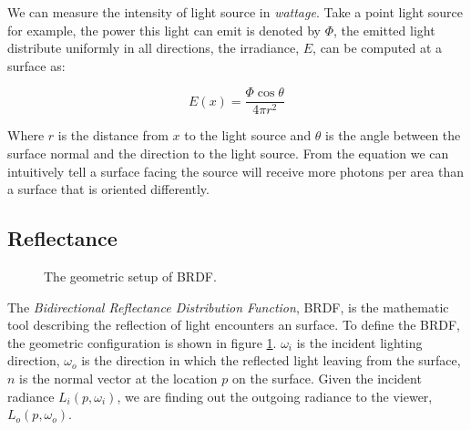 We can measure the intensity of light source in \emph{wattage}. Take a point light source for example, the power this light can emit is denoted by \(\Phi\), the emitted light distribute uniformly in all directions, the irradiance, \(E\), can be computed at a surface as: 

\begin{equation}
E(x) = \frac{\Phi \cos{\theta}}{4\pi r^{2}} 
\end{equation}

Where \(r\) is the distance from \(x\) to the light source and \(\theta\) is the angle between the surface normal and the direction to the light source. From the equation we can intuitively tell a surface facing the source will receive more photons per area than a surface that is oriented differently.   

\subsection{Reflectance} 
\begin{figure}[htp] 
    \centering 
    \renewcommand{\thefigure}{\thechapter.\arabic{figure}}
    \caption[]{The geometric setup of BRDF. }
    \label{fig:brdf} 
\end{figure} 

The \emph{Bidirectional Reflectance Distribution Function}, BRDF, is the mathematic tool describing the reflection of light encounters an surface. To define the BRDF, the geometric configuration is shown in figure \ref{fig:brdf}. \(\omega_{i}\) is the incident lighting direction, \(\omega_{o}\) is the direction in which the reflected light leaving from the surface, \(n\) is the normal vector at the location \(p\) on the surface. Given the incident radiance \(L_{i}(p, \omega_{i})\), we are finding out the outgoing radiance to the viewer, \(L_{o}(p, \omega_{o})\). 

